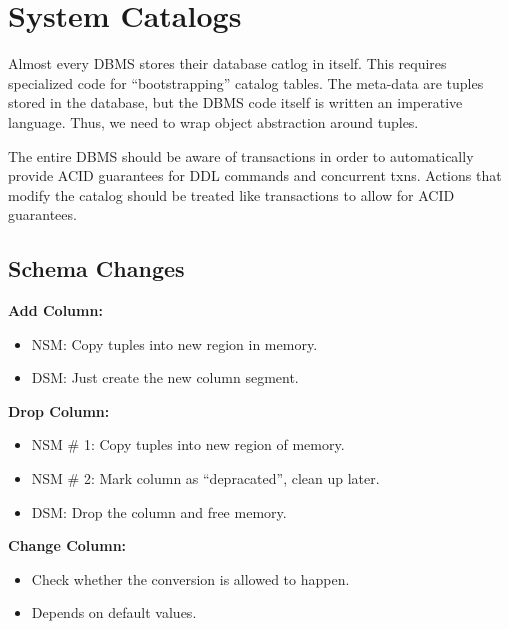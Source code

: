\documentclass[11pt]{article}
\begin{document}
\maketitle
\thispagestyle{plain}

\section{System Catalogs}
Almost every DBMS stores their database catlog in itself. This requires specialized code for 
``bootstrapping'' catalog tables.
The meta-data are tuples stored in the database, but the DBMS code itself is written an imperative 
language. Thus, we need to wrap object abstraction around tuples.

The entire DBMS should be aware of transactions in order to automatically provide ACID 
guarantees for DDL commands and concurrent txns.
Actions that modify the catalog should be treated like transactions to allow for ACID guarantees.

\subsection*{Schema Changes}

\textbf{Add Column:}
\begin{itemize}
    \item NSM:
    Copy tuples into new region in memory.
    
    \item DSM:
    Just create the new column segment.
\end{itemize}

\textbf{Drop Column:}
\begin{itemize}
    \item NSM \# 1: 
    Copy tuples into new region of memory.
    
    \item NSM \# 2: 
    Mark column as ``depracated'', clean up later.
    
    \item DSM:
    Drop the column and free memory.
\end{itemize}

\textbf{Change Column:}
\begin{itemize}
    \item
    Check whether the conversion is allowed to happen.
    
    \item
    Depends on default values.
\end{itemize}
\end{document}
